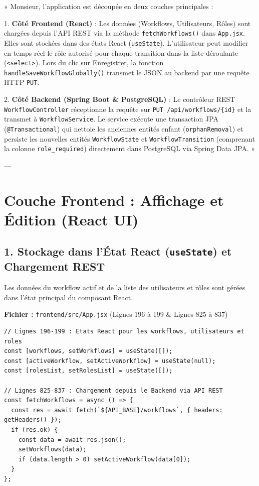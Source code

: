\documentclass[11pt,a4paper]{article}
\begin{document}
\begin{profbox}
« Monsieur, l'application est découpée en deux couches principales :

1. \textbf{Côté Frontend (React)} : Les données (Workflows, Utilisateurs, Rôles) sont chargées depuis l'API REST via la méthode \texttt{fetchWorkflows()} dans \texttt{App.jsx}. Elles sont stockées dans des états React (\texttt{useState}). L'utilisateur peut modifier en temps réel le rôle autorisé pour chaque transition dans la liste déroulante (\texttt{<select>}). Lors du clic sur Enregistrer, la fonction \texttt{handleSaveWorkflowGlobally()} transmet le JSON au backend par une requête HTTP \texttt{PUT}.

2. \textbf{Côté Backend (Spring Boot \& PostgreSQL)} : Le contrôleur REST \texttt{WorkflowController} réceptionne la requête sur \texttt{PUT /api/workflows/\{id\}} et la transmet à \texttt{WorkflowService}. Le service exécute une transaction JPA (\texttt{@Transactional}) qui nettoie les anciennes entités enfant (\texttt{orphanRemoval}) et persiste les nouvelles entités \texttt{WorkflowState} et \texttt{WorkflowTransition} (comprenant la colonne \texttt{role\_required}) directement dans PostgreSQL via Spring Data JPA. »
\end{profbox}

---

\section{Couche Frontend : Affichage et Édition (React UI)}

\subsection{1. Stockage dans l'État React (\texttt{useState}) et Chargement REST}
Les données du workflow actif et de la liste des utilisateurs et rôles sont gérées dans l'état principal du composant React.

\begin{codebox}[title=Localisation dans le Code :]
\textbf{Fichier :} \small\texttt{frontend/src/App.jsx} (Lignes 196 à 199 \& Lignes 825 à 837)
\end{codebox}

\begin{lstlisting}[language=CustomJava, caption={Stockage local et appel API de recuperation dans App.jsx}]
// Lignes 196-199 : Etats React pour les workflows, utilisateurs et roles
const [workflows, setWorkflows] = useState([]);
const [activeWorkflow, setActiveWorkflow] = useState(null);
const [rolesList, setRolesList] = useState([]);

// Lignes 825-837 : Chargement depuis le Backend via API REST
const fetchWorkflows = async () => {
  const res = await fetch(`${API_BASE}/workflows`, { headers: getHeaders() });
  if (res.ok) {
    const data = await res.json();
    setWorkflows(data);
    if (data.length > 0) setActiveWorkflow(data[0]);
  }
};
\end{lstlisting}
\end{document}
